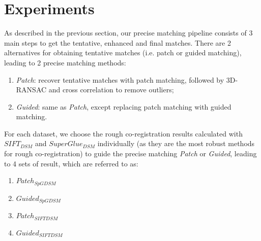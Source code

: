 \section{Experiments}
As described in the previous section, our precise matching pipeline consists of 3 main steps to get the tentative, enhanced and final matches. There are 2 alternatives for obtaining tentative matches (i.e. patch or guided matching), leading to 2 precise matching methods:\\
\begin{enumerate}
	\item \textit{Patch}: recover tentative matches with patch matching, followed by 3D-RANSAC and cross correlation to remove outliers;
	\item \textit{Guided}: same as \textit{Patch}, except replacing patch matching with guided matching.
\end{enumerate}
For each dataset, we choose the rough co-registration results calculated with $SIFT_{DSM}$ and $SuperGlue_{DSM}$ individually (as they are the most robust methods for rough co-registration) to guide the precise matching \textit{Patch} or \textit{Guided}, leading to 4 sets of result, which are referred to as:\\
\begin{enumerate}
	\item $Patch_{SpGDSM}$
	\item $Guided_{SpGDSM}$
	\item $Patch_{SIFTDSM}$
	\item $Guided_{SIFTDSM}$
\end{enumerate}

